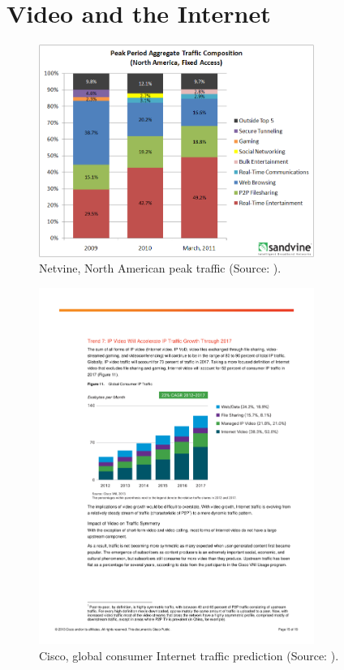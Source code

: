 \section{Video and the Internet}

\begin{figure}[htbp]
    \centering
    \includegraphics[width=0.8\textwidth]{images/netvine.png}
    \caption{Netvine, North American peak traffic (Source: \cite{sandvine_spring2011,sandvine_spring2013}).}
    \label{c1:fig:traffic_netvine}
\end{figure}

\begin{figure}[htbp]
    \centering
    \includegraphics[width=0.8\textwidth]{images/VNI_Hyperconnectivity_WP.pdf}
    \caption{Cisco, global consumer Internet traffic prediction (Source: \cite{cisco2013VNI}).}
    \label{c1:fig:traffic_cisco}
\end{figure}

